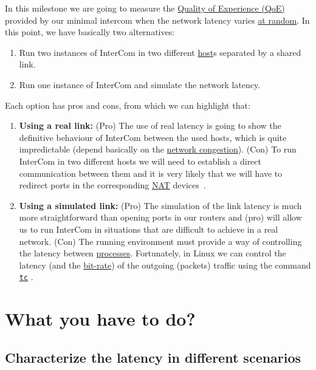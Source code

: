 In this milestone we are going to measure the
\href{https://en.wikipedia.org/wiki/Quality_of_experience}{Quality of
  Experience (QoE)} provided by our minimal intercom when the network
latency varies \href{https://en.wikipedia.org/wiki/Randomness}{at
  random}. In this point, we have basically two alternatives:
\begin{enumerate}
\item Run two instances of InterCom in two different
  \href{https://en.wikipedia.org/wiki/Host_(network)}{host}s separated
  by a shared link.
\item Run one instance of InterCom and simulate the network latency.
\end{enumerate}
Each option has pros and cons, from which we can highlight that:
\begin{enumerate}
\item \textbf{Using a real link:} (Pro) The use of real latency is
  going to show the definitive behaviour of InterCom between the used
  hosts, which is quite impredictable (depend basically on the
  \href{https://en.wikipedia.org/wiki/Network_congestion}{network
    congestion}). (Con) To run InterCom in two different hosts we will
  need to establish a direct communication between them and it is very
  likely that we will have to redirect ports in the corresponding
  \href{https://en.wikipedia.org/wiki/Network_address_translation}{NAT}
  devices~\cite{srisuresh1999nat}.
\item \textbf{Using a simulated link:} (Pro) The simulation of the
  link latency is much more straightforward than opening ports in
  our routers and (pro) will allow us to run InterCom in situations
  that are difficult to achieve in a real network. (Con) The running
  environment must provide a way of controlling the latency between
  \href{https://en.wikipedia.org/wiki/Process_(computing)}{processes}. Fortunately,
  in Linux we can control the latency (and the
  \href{https://en.wikipedia.org/wiki/Bit_rate}{bit-rate}) of the
  outgoing (packets) traffic using the command
  \href{https://man7.org/linux/man-pages/man8/tc.8.html}{\texttt{tc}}
  \cite{bert2012lartc}.
\end{enumerate}

\section{What you have to do?}

\subsection{Characterize the latency in different scenarios}

